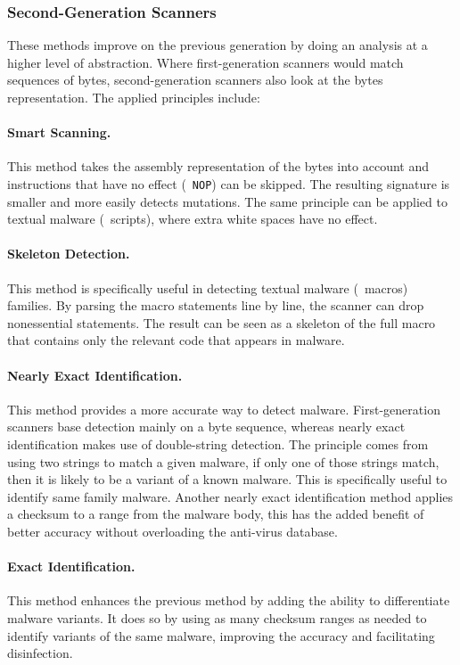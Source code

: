 \subsubsection{Second-Generation Scanners}
\label{subsection:second_gen_scanners}

These methods improve on the previous generation by doing an analysis at a higher level of abstraction.
Where first-generation scanners would match sequences of bytes, second-generation scanners also look at the bytes representation.
The applied principles include:

\paragraph{Smart Scanning.} This method takes the assembly representation of the bytes into account and instructions that have no effect (\eg\ \texttt{NOP}) can be skipped.
The resulting signature is smaller and more easily detects mutations.
The same principle can be applied to textual malware (\eg\ scripts), where extra white spaces have no effect.

\paragraph{Skeleton Detection.} This method is specifically useful in detecting textual malware (\eg\ macros) families.
By parsing the macro statements line by line, the scanner can drop nonessential statements.
The result can be seen as a skeleton of the full macro that contains only the relevant code that appears in malware.

\paragraph{Nearly Exact Identification.} This method provides a more accurate way to detect malware.
First-generation scanners base detection mainly on a byte sequence, whereas nearly exact identification makes use of double-string detection.
The principle comes from using two strings to match a given malware, if only one of those strings match, then it is likely to be a variant of a known malware.
This is specifically useful to identify same family malware.
Another nearly exact identification method applies a checksum to a range from the malware body, this has the added benefit of better accuracy without overloading the anti-virus database.

\paragraph{Exact Identification.} This method enhances the previous method by adding the ability to differentiate malware variants.
It does so by using as many checksum ranges as needed to identify variants of the same malware, improving the accuracy and facilitating disinfection.

